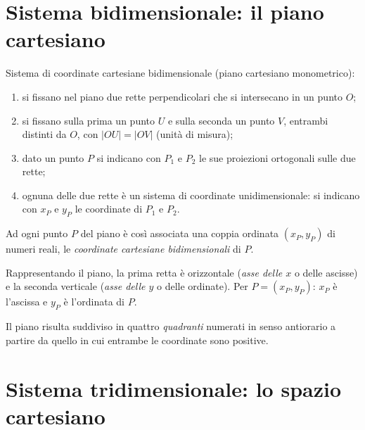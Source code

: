 \documentclass[11pt,a4paper]{article}
\theoremstyle{definition}
\begin{document}
\section{Sistema bidimensionale: il piano cartesiano}

Sistema di coordinate cartesiane bidimensionale (piano cartesiano monometrico):
\begin{enumerate}
    \item si fissano nel piano due rette perpendicolari che si intersecano in un punto $O$;
    \item si fissano sulla prima un punto $U$ e sulla seconda un punto $V$, entrambi distinti da $O$, con $|OU| = |OV|$ (unità di misura);
    \item dato un punto $P$ si indicano con $P_1$ e $P_2$ le sue proiezioni ortogonali sulle due rette;
    \item ognuna delle due rette è un sistema di coordinate unidimensionale: si indicano con $x_P$ e $y_P$ le coordinate di $P_1$ e $P_2$.
\end{enumerate}
Ad ogni punto $P$ del piano è così associata una coppia ordinata $(x_P, y_P)$ di numeri reali, le \emph{coordinate cartesiane bidimensionali} di $P$.

Rappresentando il piano, la prima retta è orizzontale (\emph{asse delle $x$} o delle ascisse) e la seconda verticale (\emph{asse delle $y$} o delle ordinate). Per $P = (x_P, y_P)$: $x_P$ è l'ascissa e $y_P$ è l'ordinata di $P$.

Il piano risulta suddiviso in quattro \emph{quadranti} numerati in senso antiorario a partire da quello in cui entrambe le coordinate sono positive.

\begin{center}
\end{center}

\section{Sistema tridimensionale: lo spazio cartesiano}
\end{document}
